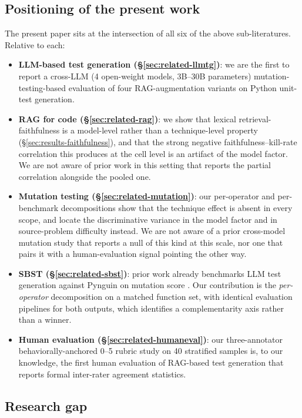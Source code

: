 \documentclass[smallextended]{svjour3}
\begin{document}
\subsection{Positioning of the present work}\label{sec:related-positioning}

The present paper sits at the intersection of all six of the above
sub-literatures. Relative to each:

\begin{itemize}
\item \textbf{LLM-based test generation
 (\S\ref{sec:related-llmtg})}: we are the first to report a
 cross-LLM (4 open-weight models, 3B–30B parameters)
 mutation-testing-based evaluation of four RAG-augmentation variants
 on Python unit-test generation.
\item \textbf{RAG for code (\S\ref{sec:related-rag})}: we show that
 lexical retrieval-faithfulness is a model-level rather than a
 technique-level property (\S\ref{sec:results-faithfulness}), and that
 the strong negative faithfulness--kill-rate correlation this
 produces at the cell level is an artifact of the model factor. We
 are not aware of prior work in this setting that reports the
 partial correlation alongside the pooled one.
\item \textbf{Mutation testing (\S\ref{sec:related-mutation})}: our
 per-operator and per-benchmark decompositions show that the technique
 effect is absent in every scope, and locate the discriminative
 variance in the model factor and in source-problem difficulty
 instead. We are not aware of a prior cross-model mutation study
 that reports a null of this kind at this scale, nor one that pairs
 it with a human-evaluation signal pointing the other way.
\item \textbf{SBST (\S\ref{sec:related-sbst})}: prior work already
 benchmarks LLM test generation against Pynguin on mutation score
 \citep{dakhel2024mutation,straubinger2025debug}. Our contribution
 is the \emph{per-operator} decomposition on a matched function
 set, with identical evaluation pipelines for both outputs, which
 identifies a complementarity axis rather than a winner.
\item \textbf{Human evaluation (\S\ref{sec:related-humaneval})}: our
 three-annotator behaviorally-anchored 0–5 rubric study on 40
 stratified samples is, to our knowledge, the first human
 evaluation of RAG-based test generation that reports formal
 inter-rater agreement statistics.
\end{itemize}

\subsection{Research gap}\label{sec:related-gap}
\end{document}
